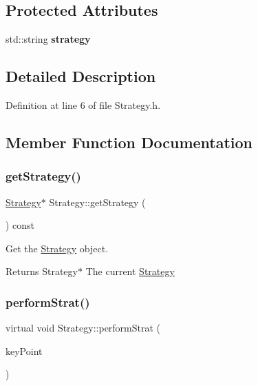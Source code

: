 \subsection*{Protected Attributes}
\begin{DoxyCompactItemize}
\item 
\mbox{\label{classStrategy_ab27bc814cf1804ca3b5fdbfb99d4a2cb}} 
std\+::string {\bfseries strategy}
\end{DoxyCompactItemize}


\subsection{Detailed Description}


Definition at line 6 of file Strategy.\+h.



\subsection{Member Function Documentation}
\mbox{\label{classStrategy_a4e5f4c986d744911085fcf67acbada22}} 
\subsubsection{\texorpdfstring{get\+Strategy()}{getStrategy()}}
{\footnotesize\ttfamily \hyperlink{classStrategy}{Strategy}$\ast$ Strategy\+::get\+Strategy (\begin{DoxyParamCaption}{ }\end{DoxyParamCaption}) const}



Get the \hyperlink{classStrategy}{Strategy} object. 

\begin{DoxyReturn}{Returns}
Strategy$\ast$ The current \hyperlink{classStrategy}{Strategy} 
\end{DoxyReturn}
\mbox{\label{classStrategy_ada170bd47bc6f11ac02d7df2b366387b}} 
\subsubsection{\texorpdfstring{perform\+Strat()}{performStrat()}}
{\footnotesize\ttfamily virtual void Strategy\+::perform\+Strat (\begin{DoxyParamCaption}\item[{\hyperlink{classKeyPoint}{Key\+Point} $\ast$}]{key\+Point }\end{DoxyParamCaption})\hspace{0.3cm}{\ttfamily [pure virtual]}}



